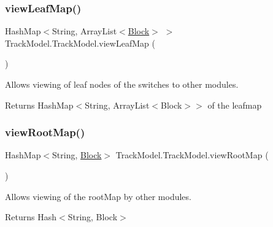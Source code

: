 \mbox{\label{classTrackModel_1_1TrackModel_a03ca2c29d73dd39a2dfb3e0342fe4e27}} 
\subsubsection{\texorpdfstring{view\+Leaf\+Map()}{viewLeafMap()}}
{\footnotesize\ttfamily Hash\+Map$<$String, Array\+List$<$\hyperlink{classTrackModel_1_1Block}{Block}$>$ $>$ Track\+Model.\+Track\+Model.\+view\+Leaf\+Map (\begin{DoxyParamCaption}{ }\end{DoxyParamCaption})}



Allows viewing of leaf nodes of the switches to other modules. 

\begin{DoxyReturn}{Returns}
Hash\+Map$<$String, Array\+List$<$\+Block$>$$>$ of the leafmap 
\end{DoxyReturn}
\mbox{\label{classTrackModel_1_1TrackModel_aa070a8864c352ab49eae4c93aa88700f}} 
\subsubsection{\texorpdfstring{view\+Root\+Map()}{viewRootMap()}}
{\footnotesize\ttfamily Hash\+Map$<$String, \hyperlink{classTrackModel_1_1Block}{Block}$>$ Track\+Model.\+Track\+Model.\+view\+Root\+Map (\begin{DoxyParamCaption}{ }\end{DoxyParamCaption})}



Allows viewing of the root\+Map by other modules. 

\begin{DoxyReturn}{Returns}
Hash$<$\+String, Block$>$ 
\end{DoxyReturn}
\mbox{\label{classTrackModel_1_1TrackModel_ae43164d0e8478c2bc5ffc3b013f49e60}} 
